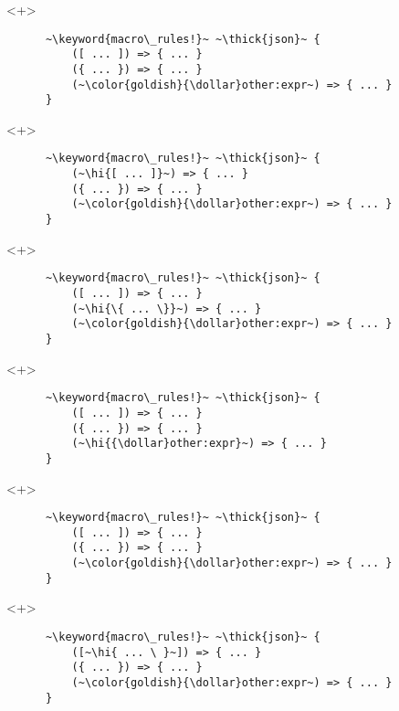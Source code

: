 \documentclass[usepdftitle=false,aspectratio=169]{beamer}
\newcommand{\dollar}{\makebox[\widthof{\$}][c]{\$}}
\newcommand{\thick}[1]{\contourlength{0.16pt}\contour[10]{black}{#1}}
\newcommand{\hi}[1]{%
\tikz[baseline=(A.base)]
 \node[highlighting=yellowbg,inner sep=0pt,text depth=0pt] (A) {#1};%
}
\newcommand{\keyword}[1]{\color{greenish}#1}
\begin{document}
\begin{frame}[fragile]
  \begin{onlyenv}<+>
    \begin{verbatim}
      ~\keyword{macro\_rules!}~ ~\thick{json}~ {
          ([ ... ]) => { ... }
          ({ ... }) => { ... }
          (~\color{goldish}{\dollar}other:expr~) => { ... }
      }
    \end{verbatim}
  \end{onlyenv}
  \begin{onlyenv}<+>
    \begin{verbatim}
      ~\keyword{macro\_rules!}~ ~\thick{json}~ {
          (~\hi{[ ... ]}~) => { ... }
          ({ ... }) => { ... }
          (~\color{goldish}{\dollar}other:expr~) => { ... }
      }
    \end{verbatim}
  \end{onlyenv}
  \begin{onlyenv}<+>
    \begin{verbatim}
      ~\keyword{macro\_rules!}~ ~\thick{json}~ {
          ([ ... ]) => { ... }
          (~\hi{\{ ... \}}~) => { ... }
          (~\color{goldish}{\dollar}other:expr~) => { ... }
      }
    \end{verbatim}
  \end{onlyenv}
  \begin{onlyenv}<+>
    \begin{verbatim}
      ~\keyword{macro\_rules!}~ ~\thick{json}~ {
          ([ ... ]) => { ... }
          ({ ... }) => { ... }
          (~\hi{{\dollar}other:expr}~) => { ... }
      }
    \end{verbatim}
  \end{onlyenv}
  \begin{onlyenv}<+>
    \begin{verbatim}
      ~\keyword{macro\_rules!}~ ~\thick{json}~ {
          ([ ... ]) => { ... }
          ({ ... }) => { ... }
          (~\color{goldish}{\dollar}other:expr~) => { ... }
      }
    \end{verbatim}
  \end{onlyenv}
  \begin{onlyenv}<+>
    \begin{verbatim}
      ~\keyword{macro\_rules!}~ ~\thick{json}~ {
          ([~\hi{ ... \ }~]) => { ... }
          ({ ... }) => { ... }
          (~\color{goldish}{\dollar}other:expr~) => { ... }
      }
    \end{verbatim}
  \end{onlyenv}
\end{frame}
\end{document}
